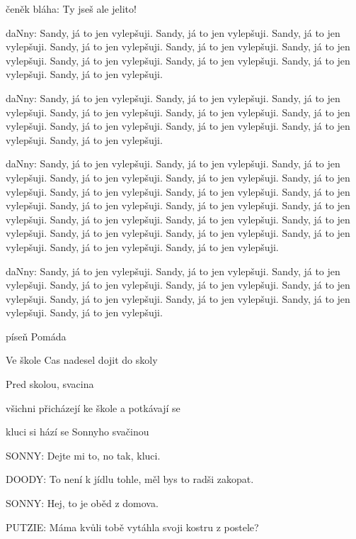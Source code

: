 \scene


\rep čeněk bláha: Ty jseš ale jelito!

\rep daNny: Sandy, já to jen vylepšuji. Sandy, já to jen vylepšuji. Sandy, já to jen vylepšuji. Sandy, já to jen vylepšuji. Sandy, já to jen vylepšuji. Sandy, já to jen vylepšuji. Sandy, já to jen vylepšuji. Sandy, já to jen vylepšuji. Sandy, já to jen vylepšuji. Sandy, já to jen vylepšuji. 


\rep daNny: Sandy, já to jen vylepšuji. Sandy, já to jen vylepšuji. Sandy, já to jen vylepšuji. Sandy, já to jen vylepšuji. Sandy, já to jen vylepšuji. Sandy, já to jen vylepšuji. Sandy, já to jen vylepšuji. Sandy, já to jen vylepšuji. Sandy, já to jen vylepšuji. Sandy, já to jen vylepšuji. 

\rep daNny: Sandy, já to jen vylepšuji. Sandy, já to jen vylepšuji. Sandy, já to jen vylepšuji. Sandy, já to jen vylepšuji. Sandy, já to jen vylepšuji. Sandy, já to jen vylepšuji. Sandy, já to jen vylepšuji. Sandy, já to jen vylepšuji. Sandy, já to jen vylepšuji. Sandy, já to jen vylepšuji. 
Sandy, já to jen vylepšuji. Sandy, já to jen vylepšuji. Sandy, já to jen vylepšuji. Sandy, já to jen vylepšuji. Sandy, já to jen vylepšuji.
Sandy, já to jen vylepšuji. Sandy, já to jen vylepšuji. Sandy, já to jen vylepšuji. Sandy, já to jen vylepšuji. Sandy, já to jen vylepšuji.

\rep daNny: Sandy, já to jen vylepšuji. Sandy, já to jen vylepšuji. Sandy, já to jen vylepšuji. Sandy, já to jen vylepšuji. Sandy, já to jen vylepšuji. Sandy, já to jen vylepšuji. Sandy, já to jen vylepšuji. Sandy, já to jen vylepšuji. Sandy, já to jen vylepšuji. Sandy, já to jen vylepšuji. 

\pop píseň Pomáda

\act Ve škole
Cas nadesel dojit do skoly

\scene Pred skolou, svacina

\pop všichni přicházejí ke škole a potkávají se

\pop kluci si hází se Sonnyho svačinou

\rep SONNY:        Dejte mi to, no tak, kluci.

\rep DOODY:        To není k jídlu tohle, měl bys to radši zakopat.

\rep SONNY:        Hej, to je oběd z domova.

\rep PUTZIE:        Máma kvůli tobě vytáhla svoji kostru z postele?


